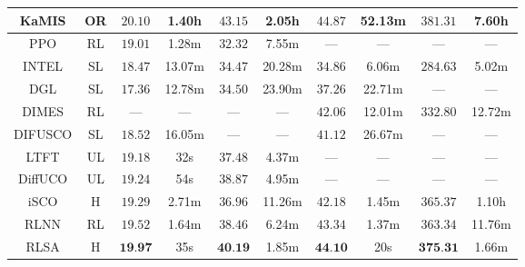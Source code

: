 \begin{table*}[ht!]
\begin{tabular}{cc|cccccccc}
     KaMIS    & OR & $20.10$  & 1.40h & $43.15$ & 2.05h & $44.87$ &  52.13m & $381.31$ & 7.60h \\%
     \midrule
     PPO & RL &  $19.01$ & 1.28m &  $32.32$ &  7.55m & --- & --- & --- & --- \\%
     INTEL & SL & $18.47$ & 13.07m &  $34.47$  &  20.28m & $34.86$ & 6.06m & $284.63$ & 5.02m \\%
     DGL & SL & $17.36$ & 12.78m & $34.50$ & 23.90m & $37.26$ & 22.71m & --- & --- \\%
     DIMES & RL  & --- & --- & --- & --- &  $42.06$ & 12.01m & $332.80$ &  12.72m \\%
     DIFUSCO & SL & $18.52$ & 16.05m & --- & --- & $41.12$ & 26.67m &  --- & --- \\%
     LTFT & UL & $19.18$ & 32s & $37.48$ & 4.37m & --- & --- & --- & --- \\%
     DiffUCO  & UL & $19.24$ & 54s & \textcolor{mygreen}{$38.87$} & 4.95m & --- & --- & --- & --- \\%
    iSCO & H & $19.29$ & 2.71m & $36.96$ & 11.26m &$42.18$ & 1.45m &  \textcolor{mygreen}{$365.37$} & 1.10h  \\%
     \midrule 
    RLNN & RL & \textcolor{mygreen}{$19.52$} & 1.64m & $38.46$  & 6.24m & \textcolor{mygreen}{$43.34$} & 1.37m & $363.34$ & 11.76m \\
    RLSA & H & $\textbf{19.97}$ & 35s & $\textbf{40.19}$ & 1.85m & $\textbf{44.10}$ & 20s &  $\textbf{375.31}$ & 1.66m \\%
    \bottomrule
    \end{tabular}
    

    \label{tab:mis}
\end{table*}
